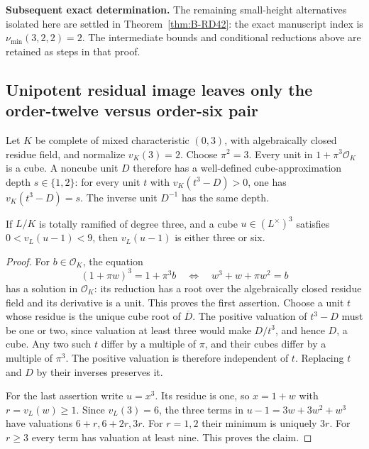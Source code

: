 \par\smallskip\noindent\textbf{Subsequent exact determination.}
The remaining small-height alternatives isolated here are settled in
Theorem~\ref{thm:B-RD42}: the exact manuscript index is
$\nu_{\min}(3,2,2)=2$. The intermediate bounds and conditional
reductions above are retained as steps in that proof.


\subsection{Unipotent residual image leaves only the order-twelve versus order-six pair}

\begin{lemma}
\label{lem:B-RD39-units}
Let $K$ be complete of mixed characteristic $(0,3)$, with algebraically
closed residue field, and normalize $v_K(3)=2$. Choose $\pi^2=3$.
Every unit in $1+\pi^3\mathcal O_K$ is a cube. A noncube unit $D$
therefore has a well-defined cube-approximation depth $s\in\{1,2\}$:
for every unit $t$ with $v_K(t^3-D)>0$, one has
$v_K(t^3-D)=s$. The inverse unit $D^{-1}$ has the same depth.

If $L/K$ is totally ramified of degree three, and a cube
$u\in(L^\times)^3$ satisfies $0<v_L(u-1)<9$, then
$v_L(u-1)$ is either three or six.
\end{lemma}
\begin{proof}
For $b\in\mathcal O_K$, the equation
\[
       (1+\pi w)^3=1+\pi^3b
       \quad\Longleftrightarrow\quad
                     w^3+w+\pi w^2=b
                                                        \tag{B-RD39.1}
\]
has a solution in $\mathcal O_K$: its reduction has a root over the
algebraically closed residue field and its derivative is a unit.
This proves the first assertion. Choose a unit $t$ whose residue is
the unique cube root of $\overline D$. The positive valuation of
$t^3-D$ must be one or two, since valuation at least three would
make $D/t^3$, and hence $D$, a cube. Any two such $t$ differ by a
multiple of $\pi$, and their cubes differ by a multiple of $\pi^3$.
The positive valuation is therefore independent of $t$.
Replacing $t$ and $D$ by their inverses preserves it.

For the last assertion write $u=x^3$. Its residue is one, so
$x=1+w$ with $r=v_L(w)\ge1$. Since $v_L(3)=6$, the three terms in
$u-1=3w+3w^2+w^3$ have valuations $6+r,6+2r,3r$.
For $r=1,2$ their minimum is uniquely $3r$. For $r\ge3$ every term
has valuation at least nine. This proves the claim.
\end{proof}

